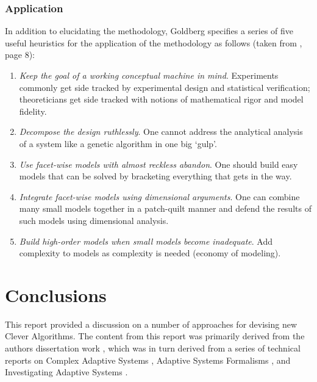 \documentclass[a4paper, 11pt]{article}
\begin{document}
%
%
\subsubsection{Application} 
In addition to elucidating the methodology, Goldberg specifies a series of five useful heuristics for the application of the methodology as follows (taken from \cite{Goldberg1999a}, page 8):

\begin{enumerate}
	\item \emph{Keep the goal of a working conceptual machine in mind}. Experiments commonly get side tracked by experimental design and statistical verification; theoreticians get side tracked with notions of mathematical rigor and model fidelity.
	\item \emph{Decompose the design ruthlessly}. One cannot address the analytical analysis of a system like a genetic algorithm in one big `gulp'.
	\item \emph{Use facet-wise models with almost reckless abandon}. One should build easy models that can be solved by bracketing everything that gets in the way.
	\item \emph{Integrate facet-wise models using dimensional arguments}. One can combine many small models together in a patch-quilt manner and defend the results of such models using dimensional analysis.
	\item \emph{Build high-order models when small models become inadequate}. Add complexity to models as complexity is needed (economy of modeling).
\end{enumerate}


% 
% 
\section{Conclusions}
\label{sec:conclusions}
This report provided a discussion on a number of approaches for devising new Clever Algorithms. 
The content from this report was primarily derived from the authors dissertation work \cite{Brownlee2008}, which was in turn derived from a series of technical reports on Complex Adaptive Systems \cite{Brownlee2007c}, Adaptive Systems Formalisms \cite{Brownlee2007d}, and Investigating Adaptive Systems \cite{Brownlee2007e}.




\end{document}

